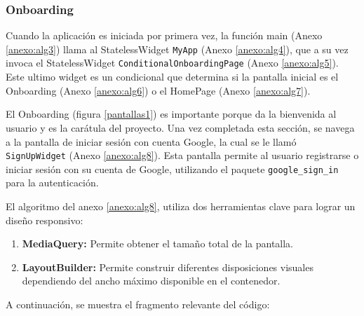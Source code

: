 




\subsubsection*{Onboarding}

Cuando la aplicación es iniciada por primera vez, la función main (Anexo \ref{anexo:alg3}) llama al StatelessWidget \texttt{MyApp} (Anexo \ref{anexo:alg4}), que a su vez invoca el StatelessWidget \texttt{ConditionalOnboardingPage} (Anexo \ref{anexo:alg5}). Este ultimo widget es un condicional que determina si la pantalla inicial es el Onboarding (Anexo \ref{anexo:alg6}) o el HomePage (Anexo \ref{anexo:alg7}).

El Onboarding (figura \ref{pantallas1}) es importante porque da la bienvenida al usuario y es la carátula del proyecto. Una vez completada esta sección, se navega a la pantalla de iniciar sesión con cuenta Google, la cual se le llamó \texttt{SignUpWidget} (Anexo \ref{anexo:alg8}). Esta pantalla permite al usuario registrarse o iniciar sesión con su cuenta de Google, utilizando el paquete \texttt{google\_sign\_in} para la autenticación.

El algoritmo del anexo \ref{anexo:alg8}, utiliza dos herramientas clave para lograr un diseño responsivo:

\begin{enumerate}
    \item \textbf{MediaQuery:} Permite obtener el tamaño total de la pantalla.
    \item \textbf{LayoutBuilder:} Permite construir diferentes disposiciones visuales dependiendo del ancho máximo disponible en el contenedor.
\end{enumerate}

A continuación, se muestra el fragmento relevante del código:

